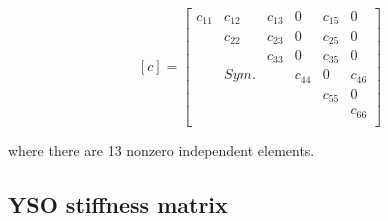 \begin{equation}
\label{eq:13elementC}
[c]=\begin{bmatrix}
c_{11} & c_{12} & c_{13} & 0 & c_{15} & 0 \\
& c_{22} & c_{23} & 0 & c_{25} & 0 \\
& & c_{33} & 0 & c_{35} & 0 \\
& Sym. & & c_{44} & 0 & c_{46} \\
& & & & c_{55} & 0 \\
& & & & & c_{66} \\
\end{bmatrix} 
\end{equation}

where there are 13 nonzero independent elements. 


\subsection{\label{sec: YSO stiffness matrix}{YSO stiffness matrix}}



